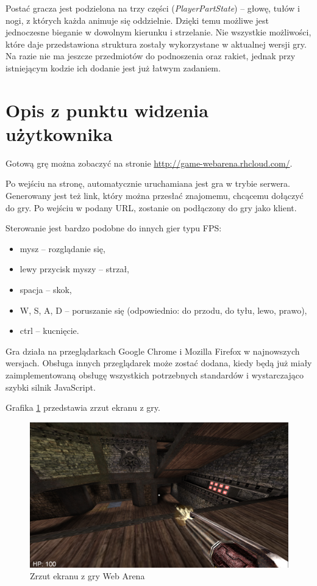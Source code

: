 Postać gracza jest podzielona na trzy części (\emph{PlayerPartState}) -- głowę, tułów i nogi, z których
każda animuje się oddzielnie. Dzięki temu możliwe jest jednoczesne bieganie w dowolnym kierunku
i strzelanie. Nie wszystkie możliwości, które daje przedstawiona struktura zostały wykorzystane w aktualnej
wersji gry. Na razie nie ma jeszcze przedmiotów do podnoszenia oraz rakiet, jednak przy istniejącym
kodzie ich dodanie jest już łatwym zadaniem.


\section{Opis z punktu widzenia użytkownika}

Gotową grę można zobaczyć na stronie \url{http://game-webarena.rhcloud.com/}.

Po wejściu na stronę, automatycznie uruchamiana jest gra w trybie serwera. Generowany jest też link,
który można przesłać znajomemu, chcącemu dołączyć do gry. Po wejściu w podany URL, zostanie on podłączony
do gry jako klient.

Sterowanie jest bardzo podobne do innych gier typu FPS:
\begin{itemize}
\item mysz -- rozglądanie się,
\item lewy przycisk myszy -- strzał,
\item spacja -- skok,
\item W, S, A, D -- poruszanie się (odpowiednio: do przodu, do tyłu, lewo, prawo),
\item ctrl -- kucnięcie.
\end{itemize}

Gra działa na przeglądarkach Google Chrome i Mozilla Firefox w najnowszych wersjach. Obsługa innych
przeglądarek może zostać dodana, kiedy będą już miały zaimplementowaną obsługę wszystkich potrzebnych
standardów i wystarczająco szybki silnik JavaScript.

Grafika \ref{fig:screen} przedstawia zrzut ekranu z gry.

\begin{figure}[h]
  \centering
  \includegraphics[scale=0.45]{zasoby/rozdzial31/screen}  
  \caption{Zrzut ekranu z gry Web Arena}
  \label{fig:screen}
\end{figure}


